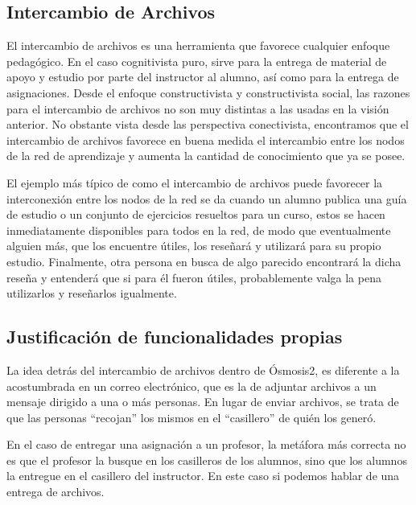 \subsection{Intercambio de Archivos}

El intercambio de archivos es una herramienta que favorece cualquier enfoque pedagógico. En el caso cognitivista puro, sirve para la entrega de material de apoyo y estudio por parte del instructor al alumno, así como para la entrega de asignaciones. Desde el enfoque constructivista y constructivista social, las razones para el intercambio de archivos no son muy distintas a las usadas en la visión anterior. No obstante vista desde las perspectiva conectivista, encontramos que el intercambio de archivos favorece en buena medida el intercambio entre los nodos de la red de aprendizaje y aumenta la cantidad de conocimiento que ya se posee. 

El ejemplo más típico de como el intercambio de archivos puede favorecer la interconexión entre los nodos de la red se da cuando un alumno publica una guía de estudio o un conjunto de ejercicios resueltos para un curso, estos se hacen inmediatamente disponibles para todos en la red, de modo que eventualmente alguien más, que los encuentre útiles, los reseñará y utilizará para su propio estudio. Finalmente, otra persona en busca de algo parecido encontrará la dicha reseña y entenderá que si para él fueron útiles, probablemente valga la pena utilizarlos y reseñarlos igualmente.


\subsection*{Justificación de funcionalidades propias}

La idea detrás del intercambio de archivos dentro de Ósmosis2, es diferente a la acostumbrada en un correo electrónico, que es la de adjuntar archivos a un mensaje dirigido a una o más personas. En lugar de enviar archivos, se trata de que las personas ``recojan'' los mismos en el ``casillero'' de quién los generó.

En el caso de entregar una asignación a un profesor, la metáfora más correcta no es que el profesor la busque en los casilleros de los alumnos, sino que los alumnos la entregue en el casillero del instructor. En este caso si podemos hablar de una entrega de archivos.


